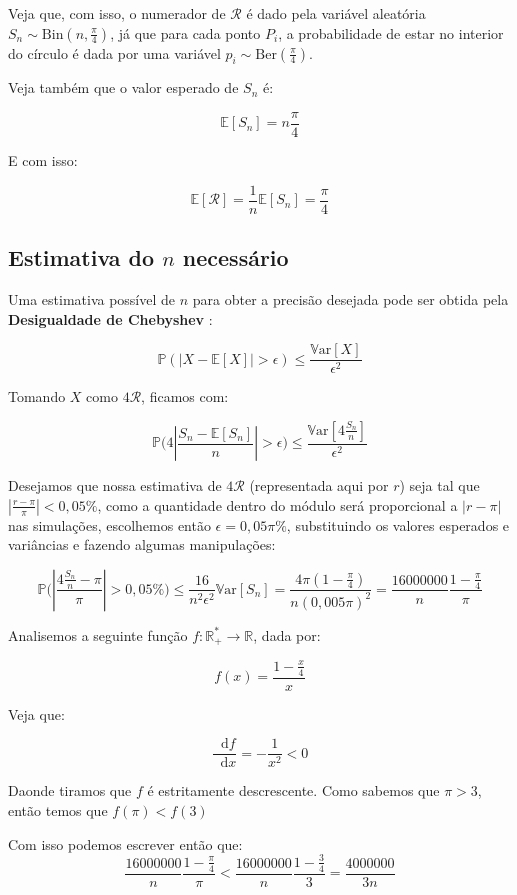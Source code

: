 \documentclass[paper=a4wide, fontsize=10pt]{scrartcl}	 %
\newcommand*\dif{\mathop{}\!\mathrm{d}}
\newcommand{\Esp}[1]{\mathbb{E}[#1]}
\newcommand{\Vari}[1]{\mathbb{V}\text{ar}[#1]}
\newcommand{\Prob}[1]{\mathbb{P}\left(#1\right)}
\newcommand{\ProbMonstro}[1]{\mathbb{P}\Bigg(#1\Bigg)}
\begin{document}
Veja que, com isso, o numerador de \(\mathcal{R}\) é dado pela variável aleatória \(S_n\sim \text{Bin}(n,\frac{\pi}{4})\), já que para cada ponto \(P_i\), a probabilidade de estar no interior do círculo é dada por uma variável \(p_i \sim \text{Ber}(\frac{\pi}{4})\).

Veja também que o valor esperado de \(S_n\) é:

\[
\Esp{S_n} = n\frac{\pi}{4}
\]

E com isso:

\[
\Esp{\mathcal{R}} =\frac{1}{n}\Esp{S_n} = \frac{\pi}{4}
\]

\subsection{Estimativa do \(n\) necessário}

Uma estimativa possível de \(n\) para obter a precisão desejada pode ser obtida pela \textbf{Desigualdade de Chebyshev} \cite{Roussas}:

\[
\Prob{\left|X-\Esp{X}\right|>\epsilon}\leqslant \frac{\Vari{X}}{\epsilon^2}
\]

Tomando \(X\) como \(4\mathcal{R}\), ficamos com:

\[
\ProbMonstro{4\left|\frac{S_n-\Esp{S_n}}{n}\right|>\epsilon} \leqslant \frac{\Vari{4\frac{S_n}{n}}}{\epsilon^2}
\]

Desejamos que nossa estimativa de \(4\mathcal{R}\) (representada aqui por \(r\)) seja tal que \(\left|\frac{r-\pi}{\pi}\right|<0,05\%\), como a quantidade dentro do módulo será proporcional a \(\left|r-\pi\right|\) nas simulações, escolhemos então \( \epsilon = 0,05 \pi \% \), substituindo os valores esperados e variâncias e fazendo algumas manipulações:

\[
\ProbMonstro{\left|\frac{4\frac{S_n}{n}-\pi}{\pi}\right|>0,05\%}  \leqslant \frac{16}{n^2\epsilon^2}\Vari{S_n} = \frac{4\pi(1-\frac{\pi}{4})}{n(0,005\pi)^2} = \frac{16000000}{n}\frac{1-\frac{\pi}{4}}{\pi}
\]

Analisemos a seguinte função \(f:\mathbb{R}^*_{+}\rightarrow\mathbb{R}\), dada por:

\[
f(x) = \frac{1-\frac{x}{4}}{x}
\]

Veja que:

\[
\frac{\dif{f}}{\dif{x}} = -\frac{1}{x^2} < 0
\]

Daonde tiramos que \(f\) é estritamente descrescente. Como sabemos que \(\pi > 3\), então temos que \(f(\pi)<f(3)\) 

Com isso podemos escrever então que:
\[
\frac{16000000}{n}\frac{1-\frac{\pi}{4}}{\pi} < \frac{16000000}{n}\frac{1-\frac{3}{4}}{3} = \frac{4000000}{3n}
\]
\end{document}
